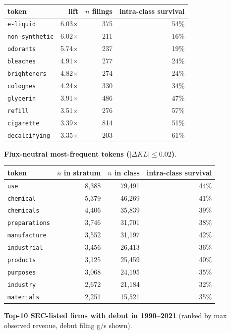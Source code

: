 \begin{tabular}{lrrr}
\toprule
token & lift & $n$ filings & intra-class survival \\
\midrule
\texttt{e-liquid} & 6.03$\times$ & 375 & 54\% \\
\texttt{non-synthetic} & 6.02$\times$ & 211 & 16\% \\
\texttt{odorants} & 5.74$\times$ & 237 & 19\% \\
\texttt{bleaches} & 4.91$\times$ & 277 & 24\% \\
\texttt{brighteners} & 4.82$\times$ & 274 & 24\% \\
\texttt{colognes} & 4.24$\times$ & 330 & 34\% \\
\texttt{glycerin} & 3.91$\times$ & 486 & 47\% \\
\texttt{refill} & 3.51$\times$ & 276 & 57\% \\
\texttt{cigarette} & 3.39$\times$ & 814 & 51\% \\
\texttt{decalcifying} & 3.35$\times$ & 203 & 61\% \\
\bottomrule
\end{tabular}

\textbf{Flux-neutral most-frequent tokens ($|\Delta KL|\leq 0.02$)}.

\begin{tabular}{lrrr}
\toprule
token & $n$ in stratum & $n$ in class & intra-class survival \\
\midrule
\texttt{use} & 8,388 & 79,491 & 44\% \\
\texttt{chemical} & 5,379 & 46,269 & 41\% \\
\texttt{chemicals} & 4,406 & 35,839 & 39\% \\
\texttt{preparations} & 3,746 & 31,701 & 38\% \\
\texttt{manufacture} & 3,552 & 31,197 & 42\% \\
\texttt{industrial} & 3,456 & 26,413 & 36\% \\
\texttt{products} & 3,125 & 25,459 & 40\% \\
\texttt{purposes} & 3,068 & 24,195 & 35\% \\
\texttt{industry} & 2,672 & 21,184 & 32\% \\
\texttt{materials} & 2,251 & 15,521 & 35\% \\
\bottomrule
\end{tabular}

\textbf{Top-10 SEC-listed firms with debut in 1990--2021} (ranked by max observed revenue, debut filing g/s shown).


